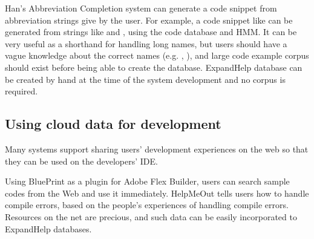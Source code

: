 \documentclass[manuscript,screen,review]{acmart}
\def\EH{\textsf{ExpandHelp}}
\begin{document}
Han's Abbreviation Completion system\cite{Han:2009:CCA:1747491.1747530}
can generate a code snippet from abbreviation strings give by the user.
For example, a code snippet like 
can be generated from strings like
 and , using the code database and HMM.
It can be very useful as a shorthand for handling long names,
but users should have a vague knowledge about the correct names
(e.g. , ),
and large code example corpus should exist before being able to
create the database.
{\EH} database can be created by hand at the time of the system development
and no corpus is required.


\subsection{Using cloud data for development}


Many systems support sharing users' development experiences on the web so that
they can be used on the developers' IDE.

Using BluePrint\cite{Brandt:2010:EPI:1753326.1753402}
as a plugin for Adobe Flex Builder,
users can search sample codes from the Web and use it immediately.
%
HelpMeOut\cite{Hartmann:2010:OPS:1753326.1753478} tells users
how to handle compile errors,
based on the people's experiences of handling compile errors.
%
Resources on the net are precious, and such data can be
easily incorporated to {\EH} databases.


% 
% 
% 
\end{document}
